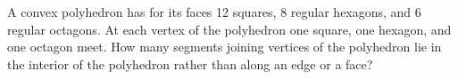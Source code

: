 A convex polyhedron has for its faces 12 squares, 8 regular hexagons, and 6 regular octagons.  At each vertex of the polyhedron one square, one hexagon, and one octagon meet.  How many segments joining vertices of the polyhedron lie in the interior of the polyhedron rather than along an edge or a face?